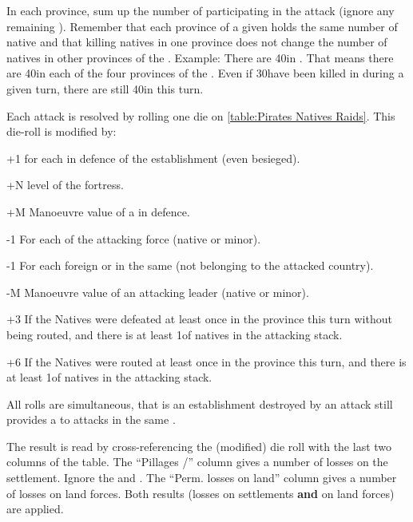 \bparag In each province, sum up the number of \LD participating in the
attack (ignore any remaining \LDE).
\bparag Remember that each province of a given \Area holds the same number of
native \LD and that killing natives in one province does not change the number
of natives in other provinces of the \Area.
\bparag Example: There are 40\LD in \granderegionJapon. That means there are
40\LD in each of the four provinces of the \Area. Even if 30\LD have been
killed in \provinceEdo during a given turn, there are still 40\LD in
\provinceKyoto this turn.

\bparag Each attack is resolved by rolling one 
die on \ref{table:Pirates
  Natives Raids}. This die-roll is modified by:
\begin{modlist}
\item[+1] for each \LD in defence of the establishment (even besieged).
\item[+N] level of the fortress.
\item[+M] Manoeuvre value of a  in defence.
\item[-1] For each \LD of the attacking force (native or \ROTW minor).
\item[-1] For each foreign \COL or \TP in the same \Area (not belonging to the
  attacked country).
\item[-M] Manoeuvre value of an attacking leader (native or \ROTW minor).
\item[+3] If the Natives were defeated at least once in the province this turn
  without being routed, and there is at least 1\LD of natives in the attacking
  stack.
\item[+6]If the Natives were routed at least once in the province this turn,
  and there is at least 1\LD of natives in the attacking stack.
\end{modlist}
\bparag All rolls are simultaneous, that is an establishment destroyed by an
attack still provides a  to attacks in the same \Area.

\bparag The result is read by cross-referencing the (modified) die roll with
the last two columns of the table.
\bparag The ``Pillages \TP/\COL'' column gives a number of losses on the
settlement. Ignore the \textddag\xspace and \textdag.
\bparag The ``Perm. losses on land'' column gives a number of losses on land
forces.
\bparag Both results (losses on settlements \textbf{and} on land forces) are
applied.

